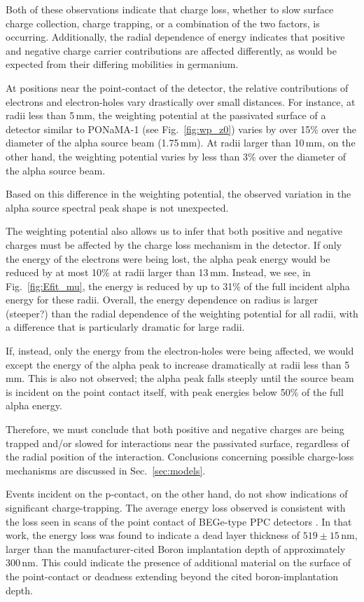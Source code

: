 Both of these observations indicate that charge loss, whether to slow surface charge collection, charge trapping, or a combination of the two factors, is occurring. Additionally, the radial dependence of energy indicates that positive and negative charge carrier contributions are affected differently, as would be expected from their differing mobilities in germanium.

At positions near the point-contact of the detector, the relative contributions of electrons and electron-holes vary drastically over small distances. For instance, at radii less than 5\,mm, the weighting potential at the passivated surface of a detector similar to PONaMA-1 (see Fig.~\ref{fig:wp_z0}) varies by over 15\% over the diameter of the alpha source beam (1.75\,mm). At radii larger than 10\,mm, on the other hand, the weighting potential varies by less than 3\% over the diameter of the alpha source beam. 

Based on this difference in the weighting potential, the observed variation in the alpha source spectral peak shape is not unexpected. 

The weighting potential also allows us to infer that both positive and negative charges must be affected by the charge loss mechanism in the detector. If only the energy of the electrons were being lost, the alpha peak energy would be reduced by at most 10\% at radii larger than 13\,mm. Instead, we see, in Fig.~\ref{fig:Efit_mu}, the energy is reduced by up to 31\% of the full incident alpha energy for these radii. Overall, the energy dependence on radius is larger (steeper?) than the radial dependence of the weighting potential for all radii, with a difference that is particularly dramatic for large radii. 

If, instead, only the energy from the electron-holes were being affected, we would except the energy of the alpha peak to increase dramatically at radii less than 5\,mm. This is also not observed; the alpha peak falls steeply until the source beam is incident on the point contact itself, with peak energies below 50\% of the full alpha energy. 

Therefore, we must conclude that both positive and negative charges are being trapped and/or slowed for interactions near the passivated surface, regardless of the radial position of the interaction. Conclusions concerning possible charge-loss mechanisms are discussed in Sec.~\ref{sec:models}.

Events incident on the p-contact, on the other hand, do not show indications of significant charge-trapping. The average energy loss observed is consistent with the loss seen in scans of the point contact of BEGe-type PPC detectors \cite{Agostini_thesis}. In that work, the energy loss was found to indicate a dead layer thickness of $519\pm15$\,nm, larger than the manufacturer-cited Boron implantation depth of approximately 300\,nm. This could indicate the presence of additional material on the surface of the point-contact or deadness extending beyond the cited boron-implantation depth. 

